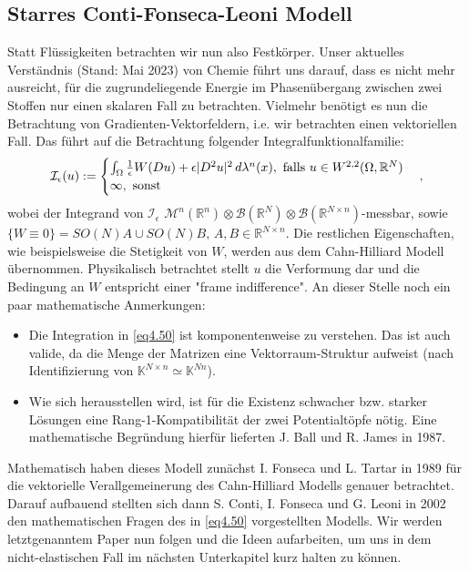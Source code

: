 \subsection{Starres Conti-Fonseca-Leoni Modell}{\label{subsec:contifonsecaleoni}}
Statt Flüssigkeiten betrachten wir nun also Festkörper. Unser aktuelles Verständnis (Stand: Mai 2023) von Chemie führt uns darauf, dass es nicht mehr ausreicht, für die zugrundeliegende Energie im Phasenübergang zwischen zwei Stoffen nur einen skalaren Fall zu betrachten. Vielmehr benötigt es nun die Betrachtung von Gradienten-Vektorfeldern, i.e. wir betrachten einen vektoriellen Fall. Das führt auf die Betrachtung folgender Integralfunktionalfamilie:
\begin{equation}{\label{eq4.50}}
    \mathcal{I}_{\epsilon}(u) := 
    \begin{cases}
        \int_{\Omega} \frac{1}{\epsilon}W(Du) + \epsilon |D^2 u|^2 \,d\lambda^n(x), \text{ falls }u \in W^{2,2}(\Omega,\mathbb{R}^N) \\
        \infty, \text{ sonst}
    \end{cases},
\end{equation}
wobei der Integrand von \(\mathcal{I}_{\epsilon}\) \(\mathcal{M}^n(\mathbb{R}^n) \otimes \mathcal{B}(\mathbb{R}^N) \otimes \mathcal{B}(\mathbb{R}^{N \times n})\)-messbar, sowie \(\{W \equiv 0\} = SO(N)A \cup SO(N)B, \, A,B \in \mathbb{R}^{N \times n}\). Die restlichen Eigenschaften, wie beispielsweise die Stetigkeit von \(W\), werden aus dem Cahn-Hilliard Modell übernommen. Physikalisch betrachtet stellt \(u\) die Verformung dar und die Bedingung an \(W\) entspricht einer "frame indifference". An dieser Stelle noch ein paar mathematische Anmerkungen:
\begin{itemize}
    \item Die Integration in \eqref{eq4.50} ist komponentenweise zu verstehen. Das ist auch valide, da die Menge der Matrizen eine Vektorraum-Struktur aufweist (nach Identifizierung von \(\mathbb{K}^{N \times n} \simeq \mathbb{K}^{Nn}\)).
    \item Wie sich herausstellen wird, ist für die Existenz schwacher bzw. starker Lösungen eine Rang-1-Kompatibilität der zwei Potentialtöpfe nötig. Eine mathematische Begründung hierfür lieferten J. Ball und R. James in \cite{ball1987fine} 1987.
\end{itemize}
Mathematisch haben dieses Modell zunächst I. Fonseca und L. Tartar in \cite{fonseca1989gradient} 1989 für die vektorielle Verallgemeinerung des Cahn-Hilliard Modells genauer betrachtet. Darauf aufbauend stellten sich dann S. Conti, I. Fonseca und G. Leoni in \cite{ContiTwoGradientPhase} 2002 den mathematischen Fragen des in \eqref{eq4.50} vorgestellten Modells. Wir werden letztgenanntem Paper nun folgen und die Ideen aufarbeiten, um uns in dem nicht-elastischen Fall im nächsten Unterkapitel kurz halten zu können.\\
